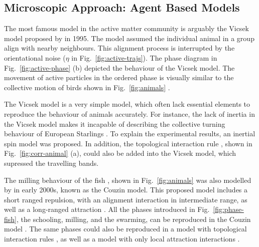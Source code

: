 \documentclass[11pt,twoside]{report}
\begin{document}
\subsection{Microscopic Approach: Agent Based Models}

The most famous model in the active matter community is arguably the Vicsek model proposed by \citeauthor{vicsek1995} in 1995. The model assumed the individual animal in a group align with nearby neighbours. This alignment process is interrupted by the orientational noise ($\eta$ in Fig.~\ref{fig:active-trajs}).
The phase diagram in Fig.~\ref{fig:active-phase} (b) depicted the behaviour of the Vicsek model. The movement of active particles in the ordered phase is visually similar to the collective motion of birds shown in Fig.~\ref{fig:animals} \cite{ballerini2008}.

The Vicsek model is a very simple model, which often lack essential elements to reproduce the behaviour of animals accurately. For instance, the lack of inertia in the Vicsek model makes it incapable of describing the collective turning behaviour of European Starlings \cite{attanasi2014np}. To explain the experimental results, an inertial spin model \cite{attanasi2014np, cavagna2015} was proposed. In addition, the topological interaction rule \cite{ballerini2008pnas}, shown in Fig.~\ref{fig:corr-animal} (a), could also be added into the Vicsek model,  which supressed the travelling bands.


The milling behaviour of the fish \cite{tunstrom2013}, shown in Fig.~\ref{fig:animals} was also modelled by \citeauthor{couzin2002} in early 2000s, known as the Couzin model. This proposed model includes a short ranged repulsion, with an alignment interaction in intermediate range, as well as a long-ranged attraction \cite{couzin2002}. All the phases introduced in Fig.~\ref{fig:phase-fish}, the schooling, milling, and the swarming, can be reproduced in the Couzin model \cite{tunstrom2013}. The same phases could also be reproduced in a model with topological interaction rules \cite{gautrais2012, calovi2014}, as well as a model with only local attraction interactions \cite{strombom2011}.
\end{document}
